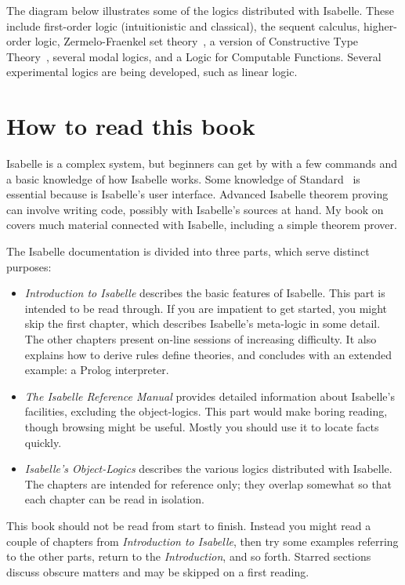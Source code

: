 The diagram below illustrates some of the logics distributed with Isabelle.
These include first-order logic (intuitionistic and classical), the sequent
calculus, higher-order logic, Zermelo-Fraenkel set theory~\cite{suppes72},
a version of Constructive Type Theory~\cite{nordstrom90}, several modal
logics, and a Logic for Computable Functions.  Several experimental logics
are being developed, such as linear logic.

\centerline{}


\section*{How to read this book}
Isabelle is a complex system, but beginners can get by with a few commands
and a basic knowledge of how Isabelle works.  Some knowledge of
Standard~\ML{} is essential because \ML{} is Isabelle's user interface.
Advanced Isabelle theorem proving can involve writing \ML{} code, possibly
with Isabelle's sources at hand.  My book on~\ML{}~\cite{paulson91} covers
much material connected with Isabelle, including a simple theorem prover.

The Isabelle documentation is divided into three parts, which serve
distinct purposes:
\begin{itemize}
\item {\em Introduction to Isabelle\/} describes the basic features of
  Isabelle.  This part is intended to be read through.  If you are
  impatient to get started, you might skip the first chapter, which
  describes Isabelle's meta-logic in some detail.  The other chapters
  present on-line sessions of increasing difficulty.  It also explains how
  to derive rules define theories, and concludes with an extended example:
  a Prolog interpreter.

\item {\em The Isabelle Reference Manual\/} provides detailed information
  about Isabelle's facilities, excluding the object-logics.  This part
  would make boring reading, though browsing might be useful.  Mostly you
  should use it to locate facts quickly.

\item {\em Isabelle's Object-Logics\/} describes the various logics
  distributed with Isabelle.  The chapters are intended for reference only;
  they overlap somewhat so that each chapter can be read in isolation.
\end{itemize}
This book should not be read from start to finish.  Instead you might read
a couple of chapters from {\em Introduction to Isabelle}, then try some
examples referring to the other parts, return to the {\em Introduction},
and so forth.  Starred sections discuss obscure matters and may be skipped
on a first reading.



